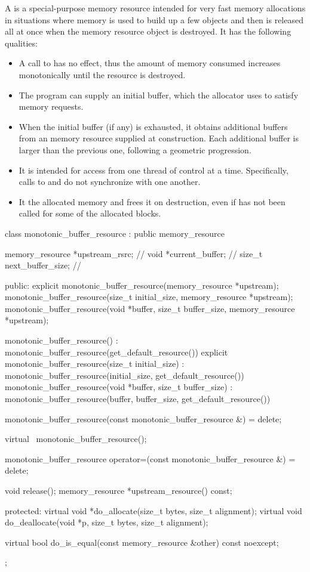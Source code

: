 \pnum
A  is a special-purpose memory resource
intended for very fast memory allocations in situations
where memory is used to build up a few objects
and then is released all at once when the memory resource object is destroyed.
It has the following qualities:
\begin{itemize}
\item
A call to  has no effect,
thus the amount of memory consumed increases monotonically
until the resource is destroyed.
\item
The program can supply an initial buffer,
which the allocator uses to satisfy memory requests.
\item
When the initial buffer (if any) is exhausted,
it obtains additional buffers from an  memory resource
supplied at construction.
Each additional buffer is larger than the previous one,
following a geometric progression.
\item
It is intended for access from one thread of control at a time.
Specifically, calls to  and 
do not synchronize with one another.
\item
It  the allocated memory and frees it on destruction,
even if  has not been called for some of the allocated blocks.
\end{itemize}

%
\begin{codeblock}
class monotonic_buffer_resource : public memory_resource {
  memory_resource *upstream_rsrc; // \expos
  void *current_buffer;           // \expos
  size_t next_buffer_size;        // \expos

public:
  explicit monotonic_buffer_resource(memory_resource *upstream);
  monotonic_buffer_resource(size_t initial_size, memory_resource *upstream);
  monotonic_buffer_resource(void *buffer, size_t buffer_size,
                            memory_resource *upstream);

  monotonic_buffer_resource()
      : monotonic_buffer_resource(get_default_resource()) {}
  explicit monotonic_buffer_resource(size_t initial_size)
      : monotonic_buffer_resource(initial_size, get_default_resource()) {}
  monotonic_buffer_resource(void *buffer, size_t buffer_size)
      : monotonic_buffer_resource(buffer, buffer_size, get_default_resource()) {}

  monotonic_buffer_resource(const monotonic_buffer_resource &) = delete;

  virtual ~monotonic_buffer_resource();

  monotonic_buffer_resource
    operator=(const monotonic_buffer_resource &) = delete;

  void release();
  memory_resource *upstream_resource() const;

protected:
  virtual void *do_allocate(size_t bytes, size_t alignment);
  virtual void do_deallocate(void *p, size_t bytes, size_t alignment);

  virtual bool do_is_equal(const memory_resource &other) const noexcept;
};
\end{codeblock}

